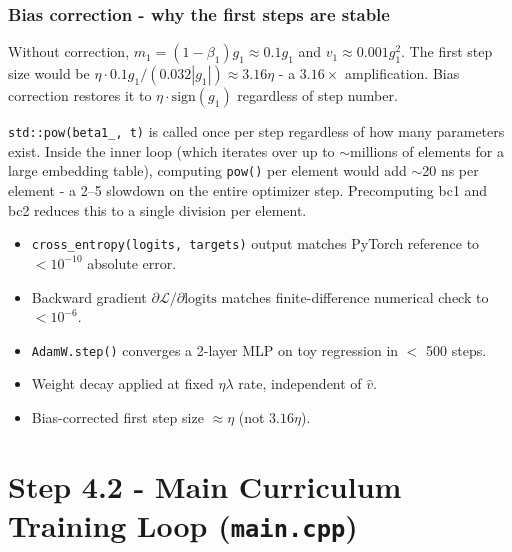 \documentclass[12pt, a4paper]{article}
\begin{document}
\subsubsection{Bias correction - why the first steps are stable}

Without correction, \(m_1 = (1-\beta_1)g_1 \approx 0.1 g_1\) and
\(v_1 \approx 0.001 g_1^2\).  The first step size would be
\(\eta \cdot 0.1g_1 / (0.032|g_1|) \approx 3.16\eta\) - a \(3.16\times\)
amplification.  Bias correction restores it to \(\eta \cdot \text{sign}(g_1)\)
regardless of step number.

\begin{tcolorbox}[interviewbox,
    title={Interview: Why precompute bc1 and bc2 outside the inner loop?}]
  \texttt{std::pow(beta1\_, t)} is called once per step regardless of how
  many parameters exist.  Inside the inner loop (which iterates over up to
  \(\sim\)millions of elements for a large embedding table), computing
  \texttt{pow()} per element would add \(\sim\)20 ns per element - a 2--5
  slowdown on the entire optimizer step.  Precomputing bc1 and bc2 reduces
  this to a single division per element.
\end{tcolorbox}

\begin{tcolorbox}[exitbox, title={Step 4.1 - Exit Criterion (met)}]
  \begin{itemize}
    \item \texttt{cross\_entropy(logits, targets)} output matches PyTorch reference
          to \(< 10^{-10}\) absolute error. \checkmark
    \item Backward gradient \(\partial\mathcal{L}/\partial\text{logits}\) matches
          finite-difference numerical check to \(< 10^{-6}\). \checkmark
    \item \texttt{AdamW.step()} converges a 2-layer MLP on toy regression in
          \(<\) 500 steps. \checkmark
    \item Weight decay applied at fixed \(\eta\lambda\) rate, independent of \(\hat{v}\). \checkmark
    \item Bias-corrected first step size \(\approx \eta\) (not \(3.16\eta\)). \checkmark
  \end{itemize}
\end{tcolorbox}


\section{Step 4.2 - Main Curriculum Training Loop (\texttt{main.cpp})}
\end{document}
